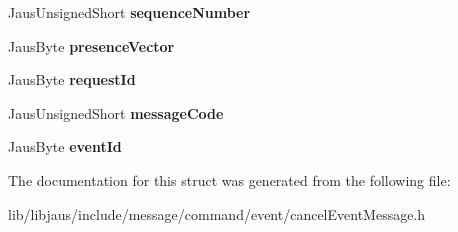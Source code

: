 \begin{DoxyCompactItemize}
\item 
\hypertarget{struct_cancel_event_message_struct_a0b6ab4b4e6ba803ab5390ffe82a0eb39}{\-Jaus\-Unsigned\-Short {\bfseries sequence\-Number}}\label{struct_cancel_event_message_struct_a0b6ab4b4e6ba803ab5390ffe82a0eb39}

\item 
\hypertarget{struct_cancel_event_message_struct_a63eadff668c9a938eafe76ae373aafde}{\-Jaus\-Byte {\bfseries presence\-Vector}}\label{struct_cancel_event_message_struct_a63eadff668c9a938eafe76ae373aafde}

\item 
\hypertarget{struct_cancel_event_message_struct_a2a20e06cb99148062f5b3ed344683295}{\-Jaus\-Byte {\bfseries request\-Id}}\label{struct_cancel_event_message_struct_a2a20e06cb99148062f5b3ed344683295}

\item 
\hypertarget{struct_cancel_event_message_struct_aa06965ed8fd449b07dd29bb319d50b40}{\-Jaus\-Unsigned\-Short {\bfseries message\-Code}}\label{struct_cancel_event_message_struct_aa06965ed8fd449b07dd29bb319d50b40}

\item 
\hypertarget{struct_cancel_event_message_struct_a23d45ef8e37b88020581a26a6cf2b118}{\-Jaus\-Byte {\bfseries event\-Id}}\label{struct_cancel_event_message_struct_a23d45ef8e37b88020581a26a6cf2b118}

\end{DoxyCompactItemize}


\-The documentation for this struct was generated from the following file\-:\begin{DoxyCompactItemize}
\item 
lib/libjaus/include/message/command/event/cancel\-Event\-Message.\-h\end{DoxyCompactItemize}
